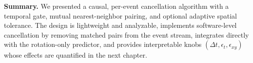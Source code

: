 \medskip
\noindent\textbf{Summary.} We presented a causal, per-event cancellation algorithm with a temporal gate, mutual nearest-neighbor pairing, and optional adaptive spatial tolerance. The design is lightweight and analyzable, implements software-level cancellation by removing matched pairs from the event stream, integrates directly with the rotation-only predictor, and provides interpretable knobs $(\Delta t,\epsilon_t,\epsilon_{xy})$ whose effects are quantified in the next chapter.
